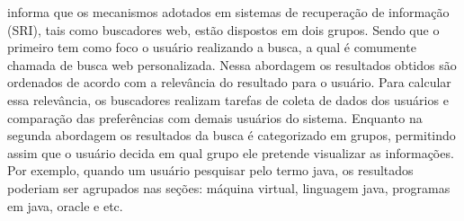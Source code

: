 \cite{Matsumoto10} informa que os mecanismos adotados em sistemas de recuperação de informação 
(SRI), tais como buscadores web, estão dispostos em dois grupos. Sendo que o primeiro tem como
foco o usuário realizando a busca, a qual é comumente chamada de busca web personalizada. 
Nessa abordagem os resultados obtidos são ordenados de acordo com a relevância do resultado
para o usuário. Para calcular essa relevância, os buscadores realizam tarefas de 
coleta de dados dos usuários e comparação das preferências com demais usuários do sistema.  
Enquanto na segunda abordagem os resultados da busca é categorizado em grupos, permitindo assim
que o usuário decida em qual grupo ele pretende visualizar as informações. Por exemplo, quando um usuário pesquisar pelo termo java, os resultados poderiam ser agrupados nas seções: máquina virtual,
linguagem java, programas em java, oracle e etc.



